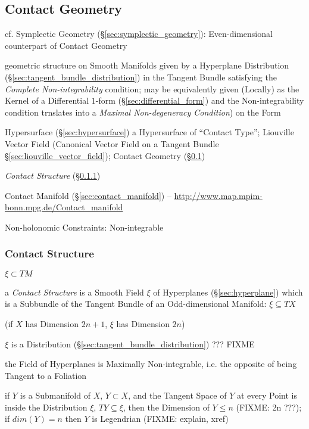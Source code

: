 \begin{itemize}
\subsection{Contact Geometry}\label{sec:contact_geometry}

\fist cf. Symplectic Geometry (\S\ref{sec:symplectic_geometry}):
Even-dimensional counterpart of Contact Geometry

geometric structure on Smooth Manifolds given by a Hyperplane Distribution
(\S\ref{sec:tangent_bundle_distribution}) in the Tangent Bundle satisfying the
\emph{Complete Non-integrability} condition; may be equivalently given
(Locally) as the Kernel of a Differential $1$-form
(\S\ref{sec:differential_form}) and the Non-integrability condition trnslates
into a \emph{Maximal Non-degeneracy Condition}) on the Form

Hypersurface (\S\ref{sec:hypersurface}) a Hypersurface of ``Contact Type'';
Liouville Vector Field (Canonical Vector Field on a Tangent Bundle
\S\ref{sec:liouville_vector_field}); \fist Contact Geometry
(\S\ref{sec:contact_geometry})

\emph{Contact Structure} (\S\ref{sec:contact_structure})

\fist Contact Manifold (\S\ref{sec:contact_manifold}) --
\url{http://www.map.mpim-bonn.mpg.de/Contact_manifold}

Non-holonomic Constraints: Non-integrable



\subsubsection{Contact Structure}\label{sec:contact_structure}

$\xi \subset TM$

a \emph{Contact Structure} is a Smooth Field $\xi$ of Hyperplanes
(\S\ref{sec:hyperplane}) which is a Subbundle of the Tangent Bundle of an
Odd-dimensional Manifold: $\xi \subseteq T X$

(if $X$ has Dimension $2n+1$, $\xi$ has Dimension $2n$) %

$\xi$ is a Distribution (\S\ref{sec:tangent_bundle_distribution}) ??? FIXME

the Field of Hyperplanes is Maximally Non-integrable, i.e. the opposite of
being Tangent to a Foliation

if $Y$ is a Submanifold of $X$, $Y \subset X$, and the Tangent Space of $Y$ at
every Point is inside the Distribution $\xi$, $T Y \subseteq \xi$, then the
Dimension of $Y \leq n$ (FIXME: 2n ???); if $dim(Y) = n$ then $Y$ is Legendrian
(FIXME: explain, xref)


\end{itemize}
